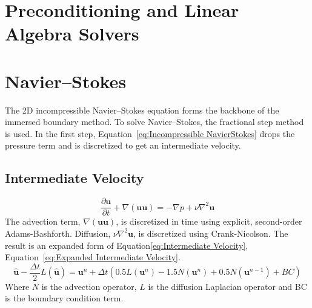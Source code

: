 \documentclass[onehalf,11pt]{beavtex}
\begin{document}
\section{Preconditioning and Linear Algebra Solvers}
\label{Preconditioning and Linear Algebra Solvers}
\section{Navier--Stokes}
\label{ID:Navier Stokes}

The 2D incompressible Navier--Stokes equation forms the backbone of the immersed boundary method.
To solve Navier--Stokes, the fractional step method is used.
In the first step, Equation~\eqref{eq:Incompressible NavierStokes} drops the pressure term and is discretized to get an intermediate velocity.

\subsection{Intermediate Velocity}
\label{ID:NS intermediate velocity}
\begin{equation}
\frac{\partial \textbf{u}}{\partial t} + \nabla ( \textbf{uu} ) = -\nabla p + \nu\nabla^{2}\textbf{u} \label{eq:Incompressible NavierStokes}
\end{equation}
The advection term, $\nabla (\textbf{uu})$, is discretized in time using explicit, second-order Adams-Bashforth.
Diffusion, $\nu \nabla^2 \textbf{u}$, is discretized using Crank-Nicolson.
The result is an expanded form of Equation\eqref{eq:Intermediate Velocity}, Equation~\eqref{eq:Expanded Intermediate Velocity}.
\begin{equation}
\label{eq:Expanded Intermediate Velocity}
\hat{\textbf{u}} - \frac{\Delta t}{2}L(\hat{\textbf{u}}) = \textbf{u}^n + \Delta t\left(0.5L(\textbf{u}^n) - 1.5N(\textbf{u}^n) + 0.5N(\textbf{u}^{n-1}) + BC\right)
\end{equation}
Where $N$ is the advection operator, $L$ is the diffusion Laplacian operator and BC is the boundary condition term.
\end{document}

